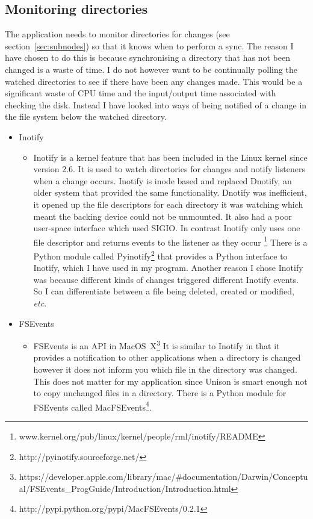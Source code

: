 \documentclass[12pt]{article}
\begin{document}
\subsection{Monitoring directories}
The application needs to monitor directories for changes
(see section~\ref{sec:subnodes})
so that it knows when to perform a sync. The reason I have
chosen to do this is because synchronising a directory that
has not been changed is a waste of time. I do not
however want to be continually polling the watched
directories to see if there have been any changes made.
This would be a significant waste of CPU time and the input/output
time associated with checking the disk. Instead
I have looked into ways of being notified of a
change in the file system below the watched directory.
\begin{itemize}
    \item Inotify
        \begin{itemize}
        \item Inotify is a kernel feature that has been
        included in the Linux kernel since version 2.6.
        It is used to watch directories for changes
        and notify listeners when a change occurs. Inotify
        is inode based and replaced Dnotify, an older system
        that provided the same functionality. Dnotify was
        inefficient, it opened up the file descriptors for
        each directory it was watching which meant the backing
        device could not be unmounted. 
        It also had a poor
        user-space interface which used SIGIO. In contrast Inotify only
        uses one file descriptor and returns events to the
        listener as they occur
        \footnote{www.kernel.org/pub/linux/kernel/people/rml/inotify/README}
        There is a Python module
        called Pyinotify\footnote{http://pyinotify.sourceforge.net/}
        that provides a Python interface
        to Inotify, which I have used in my program.
        Another reason I chose Inotify was because different kinds
        of changes triggered different Inotify events. So I
        can differentiate between a file being deleted, created
        or modified, \emph{etc}.
        \end{itemize}

    \item FSEvents
        \begin{itemize}
        \item FSEvents is an API in 
        MacOS~X\footnote{https://developer.apple.com/library/mac/\#documentation/Darwin/Conceptual/FSEvents\_ProgGuide/Introduction/Introduction.html}
        It is similar
        to Inotify in that it provides a notification to other
        applications when a directory is changed however
        it does not inform you which file in the directory
        was changed. This does not matter for my
        application since Unison is smart enough not to copy
        unchanged files in a directory. There is a Python module
        for FSEvents called
        MacFSEvents\footnote{http://pypi.python.org/pypi/MacFSEvents/0.2.1}. 
        

\end{itemize}
\end{itemize}
\end{document}
